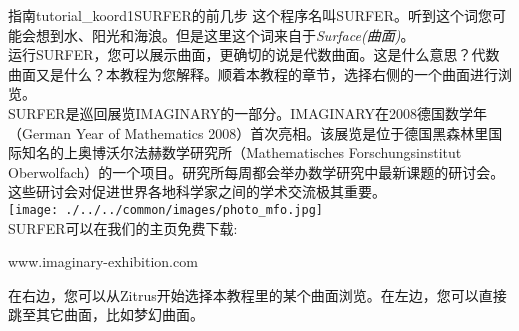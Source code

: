 ﻿\begin{surferIntroPage}{指南}{tutorial_koord1}{SURFER的前几步}
这个程序名叫SURFER。听到这个词您可能会想到水、阳光和海浪。但是这里这个词来自于\textit{Surface(曲面)}。
\\

运行SURFER，您可以展示曲面，更确切的说是代数曲面。这是什么意思？代数曲面又是什么？本教程为您解释。顺着本教程的章节，选择右侧的一个曲面进行浏览。\\
SURFER是巡回展览IMAGINARY的一部分。IMAGINARY在2008德国数学年（German Year of Mathematics 2008）首次亮相。该展览是位于德国黑森林里国际知名的上奥博沃尔法赫数学研究所（Mathematisches Forschungsinstitut Oberwolfach）的一个项目。研究所每周都会举办数学研究中最新课题的研讨会。这些研讨会对促进世界各地科学家之间的学术交流极其重要。\\
\vspace{0.2cm} \hspace{3.5cm}\texttt{[image: ./../../common/images/photo\_mfo.jpg]}\\
SURFER可以在我们的主页免费下载: \\
\begin{centering}
www.imaginary-exhibition.com\\
\end{centering}
 \vspace{0.2cm}
在右边，您可以从Zitrus开始选择本教程里的某个曲面浏览。在左边，您可以直接跳至其它曲面，比如梦幻曲面。
\end{surferIntroPage}
